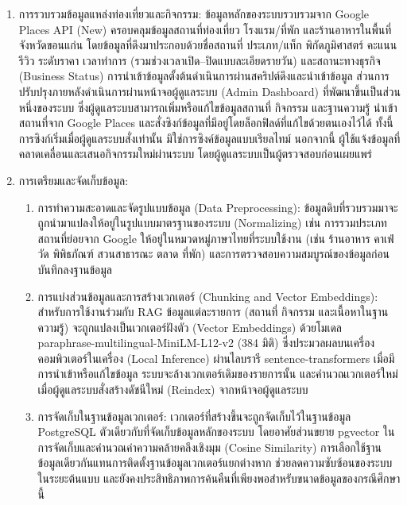 \begin{enumerate}[label=(\arabic*),leftmargin=0pt,itemindent=\dimexpr\parindent+\parenlabelwidth+1em\relax,align=right,labelwidth=\parenlabelwidth,labelsep=1em]
\item การรวบรวมข้อมูลแหล่งท่องเที่ยวและกิจกรรม: ข้อมูลหลักของระบบรวบรวมจาก Google Places API (New) ครอบคลุมข้อมูลสถานที่ท่องเที่ยว โรงแรม/ที่พัก และร้านอาหารในพื้นที่จังหวัดขอนแก่น โดยข้อมูลที่ดึงมาประกอบด้วยชื่อสถานที่ ประเภท/แท็ก พิกัดภูมิศาสตร์ คะแนนรีวิว ระดับราคา เวลาทำการ (รวมช่วงเวลาเปิด--ปิดแบบละเอียดรายวัน) และสถานะทางธุรกิจ (Business Status) การนำเข้าข้อมูลตั้งต้นดำเนินการผ่านสคริปต์ดึงและนำเข้าข้อมูล ส่วนการปรับปรุงภายหลังดำเนินการผ่านหน้าจอผู้ดูแลระบบ (Admin Dashboard) ที่พัฒนาขึ้นเป็นส่วนหนึ่งของระบบ ซึ่งผู้ดูแลระบบสามารถเพิ่มหรือแก้ไขข้อมูลสถานที่ กิจกรรม และฐานความรู้ นำเข้าสถานที่จาก Google Places และสั่งซิงก์ข้อมูลที่มีอยู่โดยล็อกฟิลด์ที่แก้ไขด้วยตนเองไว้ได้ ทั้งนี้การซิงก์เริ่มเมื่อผู้ดูแลระบบสั่งเท่านั้น มิใช่การซิงค์ข้อมูลแบบเรียลไทม์ นอกจากนี้ ผู้ใช้แจ้งข้อมูลที่คลาดเคลื่อนและเสนอกิจกรรมใหม่ผ่านระบบ โดยผู้ดูแลระบบเป็นผู้ตรวจสอบก่อนเผยแพร่
\item การเตรียมและจัดเก็บข้อมูล:
\begin{enumerate}[label=(2.\arabic*),leftmargin=0pt,itemindent=\dimexpr\parindent+\parenlabelwidth+1em+\subParenLabelWidth+1em\relax,align=right,labelwidth=\subParenLabelWidth,labelsep=1em]
\item การทำความสะอาดและจัดรูปแบบข้อมูล (Data Preprocessing): ข้อมูลดิบที่รวบรวมมาจะถูกนำมาแปลงให้อยู่ในรูปแบบมาตรฐานของระบบ (Normalizing) เช่น การรวมประเภทสถานที่ย่อยจาก Google ให้อยู่ในหมวดหมู่ภาษาไทยที่ระบบใช้งาน (เช่น ร้านอาหาร คาเฟ่ วัด พิพิธภัณฑ์ สวนสาธารณะ ตลาด ที่พัก) และการตรวจสอบความสมบูรณ์ของข้อมูลก่อนบันทึกลงฐานข้อมูล
\item การแบ่งส่วนข้อมูลและการสร้างเวกเตอร์ (Chunking and Vector Embeddings): สำหรับการใช้งานร่วมกับ RAG ข้อมูลแต่ละรายการ (สถานที่ กิจกรรม และเนื้อหาในฐานความรู้) จะถูกแปลงเป็นเวกเตอร์ฝังตัว (Vector Embeddings) ด้วยโมเดล paraphrase-multilingual-MiniLM-L12-v2 (384 มิติ) ซึ่งประมวลผลบนเครื่องคอมพิวเตอร์ในเครื่อง (Local Inference) ผ่านไลบรารี sentence-transformers เมื่อมีการนำเข้าหรือแก้ไขข้อมูล ระบบจะล้างเวกเตอร์เดิมของรายการนั้น และคำนวณเวกเตอร์ใหม่เมื่อผู้ดูแลระบบสั่งสร้างดัชนีใหม่ (Reindex) จากหน้าจอผู้ดูแลระบบ
\item การจัดเก็บในฐานข้อมูลเวกเตอร์: เวกเตอร์ที่สร้างขึ้นจะถูกจัดเก็บไว้ในฐานข้อมูล PostgreSQL ตัวเดียวกับที่จัดเก็บข้อมูลหลักของระบบ โดยอาศัยส่วนขยาย pgvector ในการจัดเก็บและคำนวณค่าความคล้ายคลึงเชิงมุม (Cosine Similarity) การเลือกใช้ฐานข้อมูลเดียวกันแทนการติดตั้งฐานข้อมูลเวกเตอร์แยกต่างหาก ช่วยลดความซับซ้อนของระบบในระยะต้นแบบ และยังคงประสิทธิภาพการค้นคืนที่เพียงพอสำหรับขนาดข้อมูลของกรณีศึกษานี้
\end{enumerate}
\end{enumerate}

